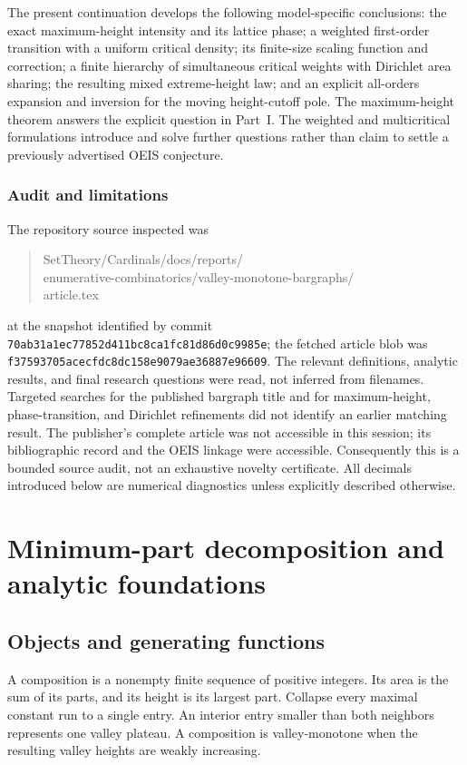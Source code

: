 \documentclass[11pt,a4paper]{article}
\numberwithin{equation}{section}
\theoremstyle{definition}\newtheorem{definition}[theorem]{Definition}
\theoremstyle{remark}\newtheorem{remark}[theorem]{Remark}
\begin{document}
The present continuation develops the following model-specific conclusions:
the exact maximum-height intensity and its lattice phase; a weighted
first-order transition with a uniform critical density; its finite-size
scaling function and correction; a finite hierarchy of simultaneous critical
weights with Dirichlet area sharing; the resulting mixed extreme-height
law; and an explicit all-orders expansion and inversion for the moving
height-cutoff pole. The maximum-height theorem answers the explicit question
in Part~I. The weighted and multicritical formulations introduce and
solve further questions rather than claim to settle a previously advertised
OEIS conjecture.

\subsubsection*{Audit and limitations}
The repository source inspected was
\begin{quote}\small\ttfamily
SetTheory/Cardinals/docs/reports/\\
enumerative-combinatorics/valley-monotone-bargraphs/\\
article.tex
\end{quote}
at the snapshot identified by commit
\texttt{70ab31a1ec77852d411bc8ca1fc81d86d0c9985e}; the fetched article blob
was \texttt{f37593705acecfdc8dc158e9079ae36887e96609}.
The relevant definitions, analytic results, and final research questions
were read, not inferred from filenames. Targeted searches for the published
bargraph title and for maximum-height, phase-transition, and Dirichlet
refinements did not identify an earlier matching result. The publisher's
complete article was not accessible in this session; its bibliographic
record and the OEIS linkage were accessible. Consequently this is a bounded
source audit, not an exhaustive novelty certificate. All decimals introduced
below are numerical diagnostics unless explicitly described otherwise.

\section{Minimum-part decomposition and analytic foundations}
\label{vmb:cw:sec:foundations}

\subsection{Objects and generating functions}
A composition is a nonempty finite sequence of positive integers. Its area
is the sum of its parts, and its height is its largest part. Collapse every
maximal constant run to a single entry. An interior entry smaller than both
neighbors represents one valley plateau. A composition is valley-monotone
when the resulting valley heights are weakly increasing.
\end{document}
